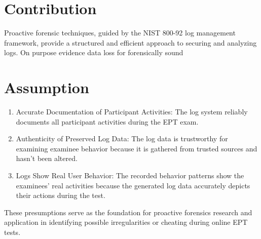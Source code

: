 \section{Contribution}
Proactive forensic techniques, guided by the NIST 800-92 log management framework, provide a structured and efficient approach to securing and analyzing logs. On purpose evidence data loss for forensically sound
\section{Assumption}


\begin{enumerate}
    \item Accurate Documentation of Participant Activities: The log system reliably documents all participant activities during the EPT exam.
    \item Authenticity of Preserved Log Data: The log data is trustworthy for examining examinee behavior because it is gathered from trusted sources and hasn't been altered.
    \item Logs Show Real User Behavior: The recorded behavior patterns show the examinees' real activities because the generated log data accurately depicts their actions during the test.
\end{enumerate}
These presumptions serve as the foundation for proactive forensics research and application in identifying possible irregularities or cheating during online EPT tests.
    

